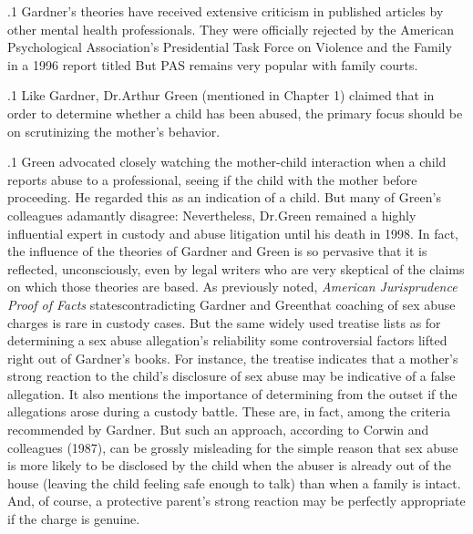 \documentclass[11pt, twoside]{article}
\begin{document}
{\p.1{%
Gardner’s theories have received extensive criticism in published articles by other mental health professionals. They were officially rejected by
the American Psychological Association’s Presidential Task Force on Violence and the Family in a 1996 report titled 
But PAS remains very popular with family courts.
}%

\p.1{%
Like Gardner, Dr.\@ Arthur Green (mentioned in Chapter 1) claimed
that in order to determine whether a child has been abused, the primary focus
should be on scrutinizing the mother’s behavior.
}%

\p.1{%
Green advocated closely watching the mother-child interaction when
a child reports abuse to a professional, seeing if the child  with
the mother before proceeding. He regarded this as an indication of a
 child. But many of Green’s colleagues adamantly disagree:  Nevertheless, Dr.\@ Green remained a highly
influential expert in custody and abuse litigation until his death in 1998.
In fact, the influence of the theories of Gardner and Green is so
pervasive that it is reflected, unconsciously, even by legal writers who
are very skeptical of the claims on which those theories are based.
As previously noted, \textit{American Jurisprudence Proof of Facts}
states\mdash{}contradicting Gardner and Green\mdash{}that coaching of sex abuse charges
is rare in custody cases. But the same widely used treatise lists as
 for determining a sex abuse allegation’s reliability some
controversial factors lifted right out of Gardner’s books. For instance, the
treatise indicates that a mother’s strong reaction to the child’s disclosure
of sex abuse may be indicative of a false allegation. It also mentions the
importance of determining from the outset if the allegations arose during a custody battle. These are, in fact, among the criteria recommended
by Gardner. But such an approach, according to Corwin and colleagues
(1987), can be grossly misleading for the simple reason that sex abuse is
more likely to be disclosed by the child when the abuser is already out
of the house (leaving the child feeling safe enough to talk) than when a
family is intact. And, of course, a protective parent’s strong reaction may
be perfectly appropriate if the charge is genuine.
}%

}
\end{document}
